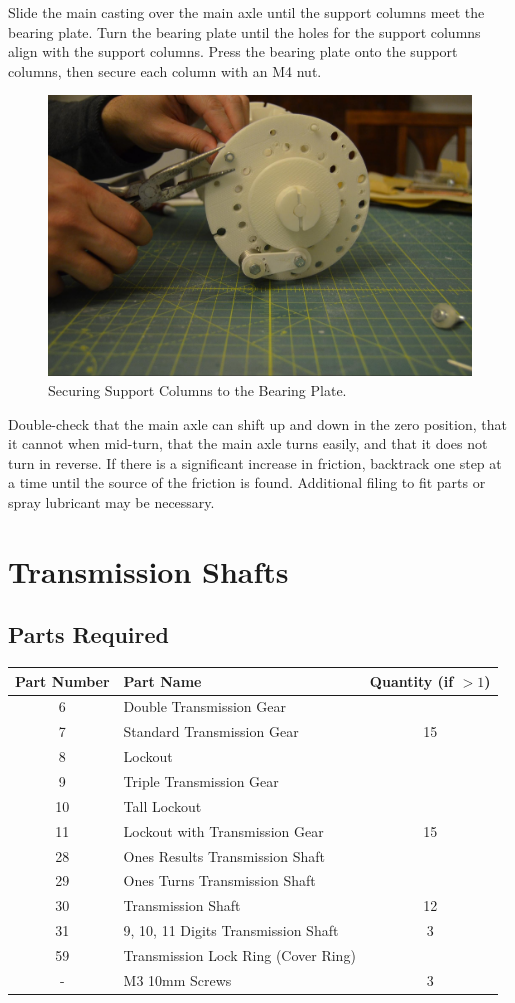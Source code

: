 \documentclass[openany]{book}
\begin{document}
Slide the main casting over the main axle until the support columns meet the bearing plate. Turn the bearing plate until the holes for the support columns align with the support columns. Press the bearing plate onto the support columns, then secure each column with an M4 nut.

\begin{figure}[!ht]
	\centering
	\includegraphics[width=.75\textwidth]{images/image32.jpg}
	\caption{Securing Support Columns to the Bearing Plate.}
	\label{fig:image32}	
\end{figure}


Double-check that the main axle can shift up and down in the zero position, that it cannot when mid-turn, that the main axle turns easily, and that it does not turn in reverse. If there is a significant increase in friction, backtrack one step at a time until the source of the friction is found. Additional filing to fit parts or spray lubricant may be necessary.




\chapter{Transmission Shafts}
\section{Parts Required}
\begin{table}[!ht]
	\centering
	\begin{tabular}{clc}
		Part Number & Part Name & Quantity (if $>1$) \\ \hline
		6 & Double Transmission Gear &  \\
		7 & Standard Transmission Gear & 15 \\
		8 & Lockout &  \\
		9 & Triple Transmission Gear & \\
		10 & Tall Lockout & \\
		11 & Lockout with Transmission Gear & 15 \\
		28 & Ones Results Transmission Shaft & \\
		29 & Ones Turns Transmission Shaft & \\
		30 & Transmission Shaft & 12 \\
		31 & 9, 10, 11 Digits Transmission Shaft & 3 \\
		59 & Transmission Lock Ring (Cover Ring) & \\ \hline \hline
		- & M3 10mm Screws & 3
	\end{tabular}
\end{table}
\end{document}
